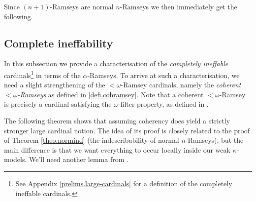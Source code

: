 \documentclass[../../main]{subfiles}
\begin{document}
Since $(n{+}1)$-Ramseys are normal $n$-Ramseys we then immediately get the following.



\subsection{Complete ineffability}

In this subsection we provide a characterisation of the \textit{completely ineffable} cardinals\footnote{See Appendix \ref{prelims.large-cardinals} for a definition of the completely ineffable cardinals.} in terms of the $\alpha$-Ramseys. To arrive at such a characterisation, we need a slight strengthening of the ${<}\omega$-Ramsey cardinals, namely the \textit{coherent ${<}\omega$-Ramseys} as defined in \ref{defi.cohramsey}. Note that a coherent ${<}\omega$-Ramsey is precisely a cardinal satisfying the $\omega$-filter property, as defined in \cite{HolySchlicht}.

\qquad The following theorem shows that assuming coherency does yield a strictly stronger large cardinal notion. The idea of its proof is closely related to the proof of Theorem \ref{theo.normind} (the indescribability of normal $n$-Ramseys), but the main difference is that we want everything to occur locally inside our weak $\kappa$-models. We'll need another lemma from \cite{Abramson}.

\end{document}
